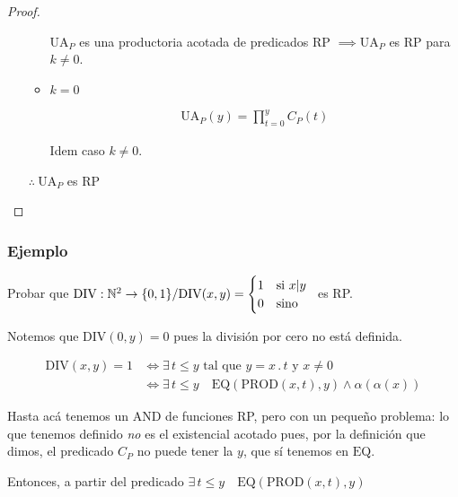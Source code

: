 \begin{proof}
\begin{itemize}
\begin{itemize}
            $\mathrm{UA}_P$ es una productoria acotada de predicados RP
            $\implies \mathrm{UA}_P$ es RP para $k \neq 0$.

        \item $k=0$

            \begin{gather*}
                \mathrm{UA}_P (y) = \prod_{t=0}^y C_P (t)
            \end{gather*}

            Idem caso $k \neq 0$.
        \end{itemize}

        \begin{center}
            $\therefore ~ \mathrm{UA}_P$ es RP
        \end{center}
    \end{itemize}
\end{proof}


\subsubsection{Ejemplo}

Probar que $\mathrm{DIV}: \mathbb{N}^2 \to \{ 0,1 \} / 
\mathrm{DIV}(x,y) = \begin{cases}
    1 & \text{si } \divides{x}{y}\\
    0 & \text{sino}
\end{cases} ~$
es RP.

Notemos que $\mathrm{DIV} (0,y) = 0$ pues la división por cero no está 
definida.

\begin{align*}
    \mathrm{DIV}(x,y) = 1 
    &\iff \exists \, t \leq y \text{ tal que } y = x \, . \, t 
    \text{ y } x \neq 0 \\
    &\iff \exists \, t \leq y \quad \mathrm{EQ}(\mathrm{PROD}(x,t),y)
    \wedge \alpha(\alpha(x))
\end{align*}

Hasta acá tenemos un $\mathrm{AND}$ de funciones RP, pero con un pequeño
%
problema: lo que tenemos definido \textit{no} es el existencial acotado pues,
por la definición que dimos, el predicado $C_P$ no puede tener la $y$, que
sí tenemos en $\mathrm{EQ}$.

Entonces, a partir del predicado 
$\exists \, t \leq y \quad \mathrm{EQ}(\mathrm{PROD}(x,t),y)$ 

